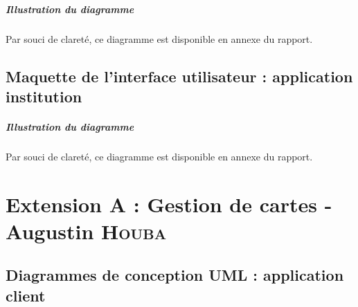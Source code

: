 \documentclass[]{report}
\begin{document}


\vspace*{\fill}

\paragraph{Illustration du diagramme} Par souci de clareté, ce diagramme est disponible en annexe du rapport.

\newpage



\section{Maquette de l'interface utilisateur : application institution}



\vspace*{\fill}

\paragraph{Illustration du diagramme} Par souci de clareté, ce diagramme est disponible en annexe du rapport.

\newpage





\chapter{Extension A : Gestion de cartes - Augustin \textsc{Houba}}



\newpage


\section{Diagrammes de conception UML : application client}
\end{document}
